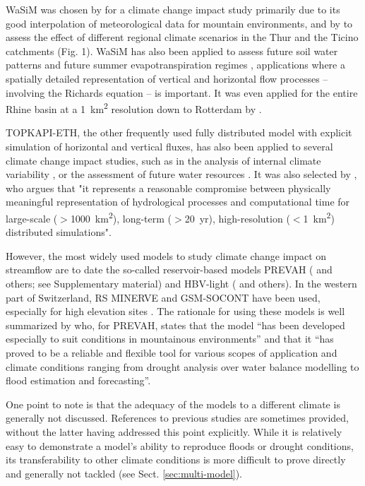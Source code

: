 \documentclass[10pt,a4paper]{article}
\begin{document}
WaSiM was chosen by \citet{Middelkoop2001} for a climate change impact study primarily due to its good interpolation of meteorological data for mountain environments, and by \citet{Jasper2004} to assess the effect of different regional climate scenarios in the Thur and the Ticino catchments (Fig. 1). WaSiM has also been applied to assess future soil water patterns \citep{Jasper2006, Rossler2012} and future summer evapotranspiration regimes \citep{Calanca2006}, applications where a spatially detailed representation of vertical and horizontal flow processes -- involving the Richards equation -- is important. It was even applied for the entire Rhine basin at a 1~km\textsuperscript{2} resolution down to Rotterdam by \citet{Kleinn2005}.

TOPKAPI-ETH, the other frequently used fully distributed model with explicit simulation of horizontal and vertical fluxes, has also been applied to several climate change impact studies, such as in the analysis of internal climate variability \citep{Fatichi2014}, or the assessment of future water resources \citep{Finger2012}. It was also selected by \citet{Fatichi2015}, who argues that "it represents a reasonable compromise between physically meaningful representation of hydrological processes and computational time for large-scale ($>$1000~km\textsuperscript{2}), long-term ($>$20~yr), high-resolution ($<$1~km\textsuperscript{2}) distributed simulations".

However, the most widely used models to study climate change impact on streamflow are to date the so-called reservoir-based models PREVAH (\citealt{Koplin2012, Speich2015, Milano2015a, Brunner2019c} and others;  see Supplementary material) and HBV-light (\citealt{Etter2017, Hakala2020, Brunner2018a, Jenicek2018}  and others). In the western part of Switzerland, RS MINERVE and GSM-SOCONT have been used, especially for high elevation sites \citep{Horton2006, Uhlmann2013a, Uhlmann2013b, Terrier2015}. The rationale for using these models is well summarized by \citet{Koplin2010} who, for PREVAH, states that the model ``has been developed especially to suit conditions in mountainous environments'' and that it ``has proved to be a reliable and flexible tool for various scopes of application and climate conditions ranging from drought analysis over water balance modelling to flood estimation and forecasting''. 

One point to note is that the adequacy of the models to a different climate is generally not discussed. References to previous studies are sometimes provided, without the latter having addressed this point explicitly. While it is relatively easy to demonstrate a model's ability to reproduce floods or drought conditions, its transferability to other climate conditions is more difficult to prove directly and generally not tackled (see Sect. \ref{sec:multi-model}).
\end{document}
